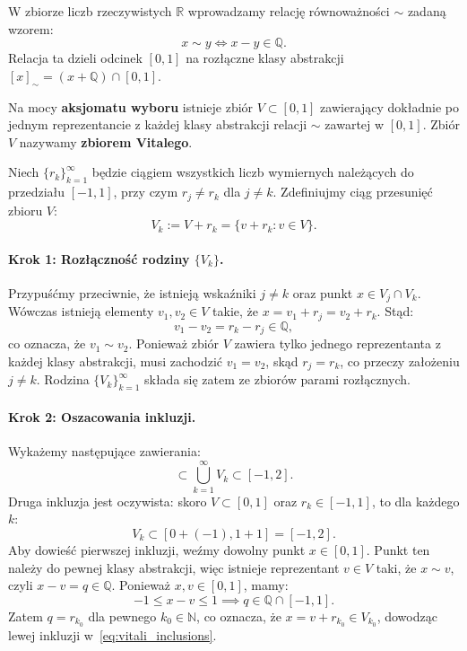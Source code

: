 \begin{dow}
    W zbiorze liczb rzeczywistych $\mathbb{R}$ wprowadzamy relację równoważności $\sim$ zadaną wzorem:
    \begin{equation*}
        x \sim y \iff x - y \in \mathbb{Q}.
    \end{equation*}
    Relacja ta dzieli odcinek $[0, 1]$ na rozłączne klasy abstrakcji $[x]_\sim = (x + \mathbb{Q}) \cap [0, 1]$.

    Na mocy \textbf{aksjomatu wyboru} istnieje zbiór $V \subset [0, 1]$ zawierający dokładnie po jednym reprezentancie z każdej klasy abstrakcji relacji $\sim$ zawartej w $[0, 1]$. Zbiór $V$ nazywamy \textbf{zbiorem Vitalego}.

    Niech $\{r_k\}_{k=1}^\infty$ będzie ciągiem wszystkich liczb wymiernych należących do przedziału $[-1, 1]$, przy czym $r_j \neq r_k$ dla $j \neq k$. Zdefiniujmy ciąg przesunięć zbioru $V$:
    \begin{equation*}
        V_k := V + r_k = \{v + r_k \colon v \in V\}.
    \end{equation*}

    \paragraph{Krok 1: Rozłączność rodziny $\{V_k\}$.}
    Przypuśćmy przeciwnie, że istnieją wskaźniki $j \neq k$ oraz punkt $x \in V_j \cap V_k$. Wówczas istnieją elementy $v_1, v_2 \in V$ takie, że $x = v_1 + r_j = v_2 + r_k$. Stąd:
    \begin{equation*}
        v_1 - v_2 = r_k - r_j \in \mathbb{Q},
    \end{equation*}
    co oznacza, że $v_1 \sim v_2$. Ponieważ zbiór $V$ zawiera tylko jednego reprezentanta z każdej klasy abstrakcji, musi zachodzić $v_1 = v_2$, skąd $r_j = r_k$, co przeczy założeniu $j \neq k$. Rodzina $\{V_k\}_{k=1}^\infty$ składa się zatem ze zbiorów parami rozłącznych.

    \paragraph{Krok 2: Oszacowania inkluzji.}
    Wykażemy następujące zawierania:
    \begin{equation}\label{eq:vitali_inclusions}
        \subset \bigcup_{k=1}^\infty V_k \subset [-1, 2].
    \end{equation}
    Druga inkluzja jest oczywista: skoro $V \subset [0, 1]$ oraz $r_k \in [-1, 1]$, to dla każdego $k$:
    \begin{equation*}
        V_k \subset [0 + (-1), 1 + 1] = [-1, 2].
    \end{equation*}
    Aby dowieść pierwszej inkluzji, weźmy dowolny punkt $x \in [0, 1]$. Punkt ten należy do pewnej klasy abstrakcji, więc istnieje reprezentant $v \in V$ taki, że $x \sim v$, czyli $x - v = q \in \mathbb{Q}$. Ponieważ $x, v \in [0, 1]$, mamy:
    \begin{equation*}
        -1 \le x - v \le 1 \implies q \in \mathbb{Q} \cap [-1, 1].
    \end{equation*}
    Zatem $q = r_{k_0}$ dla pewnego $k_0 \in \mathbb{N}$, co oznacza, że $x = v + r_{k_0} \in V_{k_0}$, dowodząc lewej inkluzji w~\eqref{eq:vitali_inclusions}.


\end{dow}
